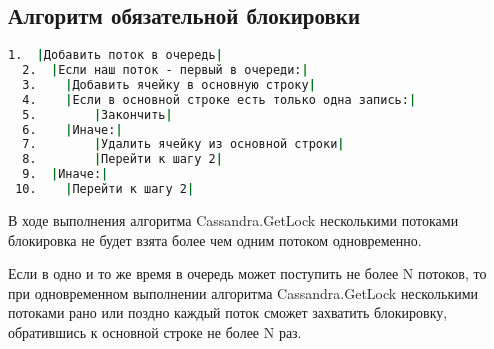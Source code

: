 \subsection{Алгоритм обязательной блокировки}

\begin{lstlisting}[language=csh,caption={Алгоритм Cassandra.GetLock(lockId, threadId)}]
  1.  |Добавить поток в очередь|
  2.  |Если наш поток - первый в очереди:|
  3.  	|Добавить ячейку в основную строку|
  4.  	|Если в основной строке есть только одна запись:|
  5.  		|Закончить|
  6.  	|Иначе:|
  7.  		|Удалить ячейку из основной строки|
  8.  		|Перейти к шагу 2|
  9.  |Иначе:|
 10.  	|Перейти к шагу 2|

\end{lstlisting}

\begin{theorem}
В ходе выполнения алгоритма Cassandra.GetLock несколькими потоками блокировка не будет взята более чем одним потоком одновременно.
\end{theorem}

\begin{theorem}
Если в одно и то же время в очередь может поступить не более N потоков, то при одновременном выполнении алгоритма Cassandra.GetLock несколькими потоками рано или поздно каждый поток сможет захватить блокировку, обратившись к основной строке не более N раз.
\end{theorem}